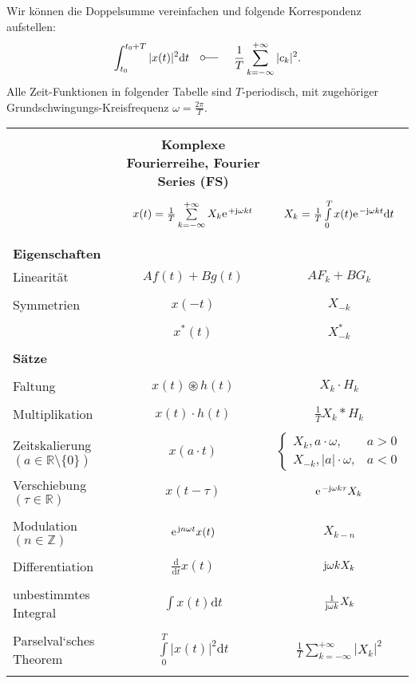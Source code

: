 \documentclass[11pt,a4paper,DIV=12]{scrartcl}
\newcommand{\diff}{\mathrm{d}}
\begin{document}
Wir können die Doppelsumme vereinfachen und folgende Korrespondenz aufstellen:
%
\begin{align}
	\int_{t_0}^{t_0+T}|x(t)|^2\diff t
	\quad\fourier\quad\frac{1}{T}\sum_{k=-\infty}^{+\infty}|c_k|^2.
\end{align}
\newpage
Alle Zeit-Funktionen in folgender Tabelle sind $T$-periodisch, mit zugehöriger
Grundschwingungs-Kreisfrequenz $\omega = \frac{2\pi}{T}$.\\
\begin{tabular}{|lcc|}
	\hline
	&&\\
	&\textbf{Komplexe Fourierreihe, Fourier Series (FS)}& \\
	\hline
	&&\\
	& $x(t)=\frac{1}{T}\sum\limits_{k=-\infty}^{+\infty}X_k\e^{+\im\omega k t} $
	& $X_k=\frac{1}{T}\int\limits_0^Tx(t)\e^{-\im\omega k t}\mathrm{d}t $ \\&&\\
	\hline
	&&\\
	\textbf{Eigenschaften} & & \\
	Linearität & $Af(t)+Bg(t)$ & $AF_k+BG_k$\\&& \\
	Symmetrien & $x(-t)$ & $X_{-k}$ \\ &&\\
	& $x^*(t)$ & $X^*_{-k}$ \\ &&\\
	\hline
	\textbf{Sätze} & & \\&& \\
	Faltung & $x(t)\circledast h(t)$ & $X_k\cdot H_k$ \\&& \\
	Multiplikation & $x(t)\cdot h(t)$ & $\frac{1}{T}X_k \ast H_k $ \\&& \\
	Zeitskalierung $(a\in\mathbb{R}\setminus\{0\})$& $x(a\cdot t)$ & $\begin{cases}
		X_k,a\cdot\omega, &a>0\\
		X_{-k},|a|\cdot\omega, &a<0
	\end{cases}$\\
	Verschiebung $(\tau \in \mathbb{R})$ & $x(t-\tau)$& $\e^{-\im\omega k \tau}X_k$\\&& \\
	Modulation $(n \in \mathbb{Z})$& $\e^{\im n \omega t}x(t)$ & $X_{k-n}$ \\&& \\
	Differentiation & $\frac{\mathrm{d}}{\mathrm{d}t}x(t)$ & $\im\omega k X_k$\\&& \\
	unbestimmtes Integral &$\int x(t)\mathrm{d}t $ & $\frac{1}{\im\omega k}X_k$\\&& \\
	Parselval`sches Theorem & $\int\limits_0^T|x(t)|^2\mathrm{d}t$ & $\frac{1}{T}\sum\limits_{k=-\infty}^{+\infty}|X_k|^2$\\&& \\
	\hline
\end{tabular}







\renewcommand{\refname}{Buchzitate}
\clearpage

\end{document}
